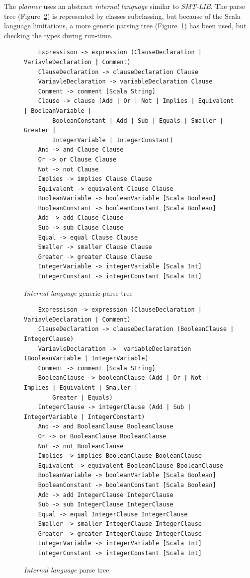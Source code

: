 \documentclass{report}
\theoremstyle{plain}
\begin{document}
\vspace{1\baselineskip}

The \emph{planner} uses an abstract \emph{internal language} similar to \emph{SMT-LIB}. The parse tree (Figure~\ref{fig:parse-tree}) is represented by classes subclassing, but because of the Scala language limitations, a more generic parsing tree (Figure~\ref{fig:parse-tree-generic}) has been used, but checking the types during run-time.

\begin{figure}
    \centering
    \begin{verbatim}
    Expressison -> expression (ClauseDeclaration | VariavleDeclaration | Comment)
    ClauseDeclaration -> clauseDeclaration Clause
    VariavleDeclaration -> variableDeclaration Clause
    Comment -> comment [Scala String]
    Clause -> clause (Add | Or | Not | Implies | Equivalent | BooleanVariable |
        BooleanConstant | Add | Sub | Equals | Smaller | Greater | 
        IntegerVariable | IntegerConstant)
    And -> and Clause Clause
    Or -> or Clause Clause
    Not -> not Clause
    Implies -> implies Clause Clause
    Equivalent -> equivalent Clause Clause
    BooleanVariable -> booleanVariable [Scala Boolean]
    BooleanConstant -> booleanConstant [Scala Boolean]
    Add -> add Clause Clause
    Sub -> sub Clause Clause
    Equal -> equal Clause Clause
    Smaller -> smaller Clause Clause
    Greater -> greater Clause Clause
    IntegerVariable -> integerVariable [Scala Int]
    IntegerConstant -> integerConstant [Scala Int]
    \end{verbatim}
    \caption{\emph{Internal language} generic parse tree}
    \label{fig:parse-tree-generic}
\end{figure}

\begin{figure}
    \centering
    \begin{verbatim}
    Expressison -> expression (ClauseDeclaration | VariavleDeclaration | Comment)
    ClauseDeclaration -> clauseDeclaration (BooleanClause | IntegerClause)
    VariavleDeclaration ->  variableDeclaration (BooleanVariable | IntegerVariable)
    Comment -> comment [Scala String] 
    BooleanClause -> booleanClause (Add | Or | Not | Implies | Equivalent | Smaller |
        Greater | Equals)
    IntegerClause -> integerClause (Add | Sub | IntegerVariable | IntegerConstant)
    And -> and BooleanClause BooleanClause
    Or -> or BooleanClause BooleanClause
    Not -> not BooleanClause
    Implies -> implies BooleanClause BooleanClause
    Equivalent -> equivalent BooleanClause BooleanClause
    BooleanVariable -> booleanVariable [Scala Boolean]
    BooleanConstant -> booleanConstant [Scala Boolean]
    Add -> add IntegerClause IntegerClause
    Sub -> sub IntegerClause IntegerClause
    Equal -> equal IntegerClause IntegerClause
    Smaller -> smaller IntegerClause IntegerClause
    Greater -> greater IntegerClause IntegerClause
    IntegerVariable -> integerVariable [Scala Int]
    IntegerConstant -> integerConstant [Scala Int]
    \end{verbatim}
    \caption{\emph{Internal language} parse tree}
    \label{fig:parse-tree}
\end{figure}
\end{document}
